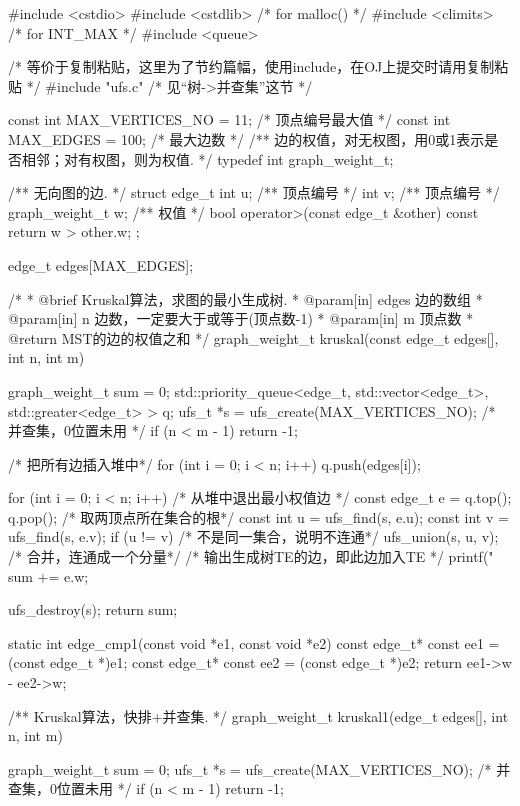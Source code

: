 \begin{Codex}[label=kruskal.c]
#include <cstdio>
#include <cstdlib>  /* for malloc() */
#include <climits>  /* for INT_MAX */
#include <queue>

/* 等价于复制粘贴，这里为了节约篇幅，使用include，在OJ上提交时请用复制粘贴 */
#include "ufs.c"  /* 见“树->并查集”这节 */

const int MAX_VERTICES_NO = 11; /* 顶点编号最大值 */
const int MAX_EDGES = 100;  /* 最大边数 */
/** 边的权值，对无权图，用0或1表示是否相邻；对有权图，则为权值. */
typedef int graph_weight_t;

/** 无向图的边. */
struct edge_t{
    int u;  /** 顶点编号 */
    int v;  /** 顶点编号 */
    graph_weight_t w;  /** 权值 */
    bool operator>(const edge_t &other) const {
        return w > other.w;
    }
};

edge_t edges[MAX_EDGES];


/*
  * @brief Kruskal算法，求图的最小生成树.
  * @param[in] edges 边的数组
  * @param[in] n 边数，一定要大于或等于(顶点数-1)
  * @param[in] m 顶点数
  * @return MST的边的权值之和
  */
graph_weight_t kruskal(const edge_t edges[], int n, int m) {
    graph_weight_t sum = 0;
    std::priority_queue<edge_t, std::vector<edge_t>,
                                std::greater<edge_t> > q;
    ufs_t *s = ufs_create(MAX_VERTICES_NO);  /* 并查集，0位置未用  */
    if (n < m - 1) return -1;

    /* 把所有边插入堆中*/
    for (int i = 0; i < n; i++) {
        q.push(edges[i]);
    }

    for (int i = 0; i < n; i++) {
        /* 从堆中退出最小权值边 */
        const edge_t e = q.top(); q.pop();
        /* 取两顶点所在集合的根*/
        const int u = ufs_find(s, e.u);
        const int v = ufs_find(s, e.v);
        if (u != v) { /* 不是同一集合，说明不连通*/
            ufs_union(s, u, v); /* 合并，连通成一个分量*/
            /* 输出生成树TE的边，即此边加入TE */
            printf("%
            sum += e.w;
        }
    }

    ufs_destroy(s);
    return sum;
}

static int edge_cmp1(const void *e1, const void *e2) {
    const edge_t* const ee1 = (const edge_t *)e1;
    const edge_t* const ee2 = (const edge_t *)e2;
    return ee1->w - ee2->w;
}

/** Kruskal算法，快排+并查集. */
graph_weight_t kruskal1(edge_t edges[], int n, int m) {
    graph_weight_t sum = 0;
    ufs_t *s = ufs_create(MAX_VERTICES_NO);  /* 并查集，0位置未用  */
    if (n < m - 1) return -1;

}
\end{Codex}
